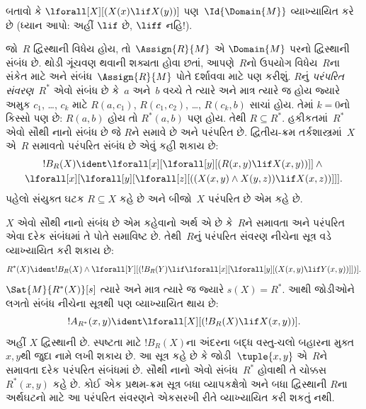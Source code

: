 \begin{prob}
બતાવો કે $\lforall[X][(X(x) \lif X(y))]$ પણ~$\Id{\Domain{M}}$
વ્યાખ્યાયિત કરે છે (ધ્યાન આપો: અહીં $\lif$ છે, $\liff$ નહિ!).
\end{prob}

\begin{ex}
જો~$R$ દ્વિસ્થાની વિધેય હોય, તો~$\Assign{R}{M}$ એ
$\Domain{M}$ પરનો દ્વિસ્થાની સંબંધ છે. થોડી ગૂંચવણ થવાની શક્યતા
હોવા છતાં, આપણે~$R$નો ઉપયોગ વિધેય~$R$ના સંકેત માટે અને
સંબંધ~$\Assign{R}{M}$ પોતે દર્શાવવા માટે પણ કરીશું. $R$નું
\emph{પરંપરિત સંવરણ}~$R^*$ એવો સંબંધ છે કે~$a$ અને~$b$ વચ્ચે તે
ત્યારે અને માત્ર ત્યારે જ હોય જ્યારે અમુક $c_1$, \dots, $c_k$
માટે $R(a,c_1)$, $R(c_1, c_2)$, \dots, $R(c_k,b)$ સાચાં હોય.
તેમાં $k = 0$નો કિસ્સો પણ છે: $R(a,b)$ હોય તો $R^*(a,b)$ પણ હોય.
તેથી $R \subseteq R^*$. હકીકતમાં~$R^*$ એવો સૌથી નાનો સંબંધ છે જે
$R$ને સમાવે છે અને પરંપરિત છે. દ્વિતીય-ક્રમ તર્કશાસ્ત્રમાં~$X$ એ~$R$
સમાવતો પરંપરિત સંબંધ છે એવું કહી શકાય છે:
\begin{multline*}
  !B_R(X) \ident \lforall[x][\lforall[y][(R(x,y) \lif X(x, y))]] \land {}\\
\lforall[x][\lforall[y][\lforall[z][((X(x,y) \land X(y,z)) \lif X(x,
      z))]]].
\end{multline*}
પહેલો સંયુક્ત ઘટક $R \subseteq X$ કહે છે અને બીજો~$X$ પરંપરિત છે એમ કહે
છે.

$X$ એવો સૌથી નાનો સંબંધ છે એમ કહેવાનો અર્થ એ છે કે~$R$ને સમાવતા
અને પરંપરિત એવા દરેક સંબંધમાં તે પોતે સમાવિષ્ટ છે. તેથી~$R$નું
પરંપરિત સંવરણ નીચેના સૂત્ર વડે વ્યાખ્યાયિત કરી શકાય છે:
\[
R^*(X) \ident !B_R(X) \land \lforall[Y][(!B_R(Y) \lif
  \lforall[x][\lforall[y][(X(x, y) \lif Y(x,y))]])].
\]
$\Sat{M}{R^*(X)}[s]$ ત્યારે અને માત્ર ત્યારે જ જ્યારે $s(X) = R^*$.
આથી જોડીઓને લગતો સંબંધ નીચેના સૂત્રથી પણ વ્યાખ્યાયિત થાય છે:
\[
!A_{R^*}(x,y) \ident
\lforall[X][(!B_R(X) \lif X(x,y))].
\]
અહીં $X$ દ્વિસ્થાની છે. સ્પષ્ટતા માટે $!B_R(X)$ના અંદરના બદ્ધ
વસ્તુ-ચલો બહારના મુક્ત $x,y$થી જુદા નામે લખી શકાય છે. આ સૂત્ર કહે છે કે
જોડી~$\tuple{x,y}$ એ~$R$ને સમાવતા દરેક પરંપરિત સંબંધમાં છે.
સૌથી નાનો એવો સંબંધ~$R^*$ હોવાથી તે ચોક્કસ $R^*(x,y)$ કહે છે.
કોઈ એક પ્રથમ-ક્રમ સૂત્ર બધા વ્યાપકક્ષેત્રો અને બધા દ્વિસ્થાની
$R$ના અર્થઘટનો માટે આ પરંપરિત સંવરણને એકસરખી રીતે વ્યાખ્યાયિત
કરી શકતું નથી.
\end{ex}
\endgroup



